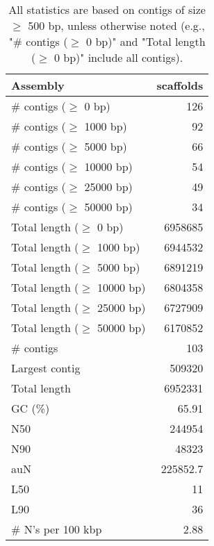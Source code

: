 \documentclass[12pt,a4paper]{article}
\begin{document}
\begin{table}[ht]
\begin{center}
\caption{All statistics are based on contigs of size $\geq$ 500 bp, unless otherwise noted (e.g., "\# contigs ($\geq$ 0 bp)" and "Total length ($\geq$ 0 bp)" include all contigs).}
\begin{tabular}{|l*{1}{|r}|}
\hline
Assembly & scaffolds \\ \hline
\# contigs ($\geq$ 0 bp) & 126 \\ \hline
\# contigs ($\geq$ 1000 bp) & 92 \\ \hline
\# contigs ($\geq$ 5000 bp) & 66 \\ \hline
\# contigs ($\geq$ 10000 bp) & 54 \\ \hline
\# contigs ($\geq$ 25000 bp) & 49 \\ \hline
\# contigs ($\geq$ 50000 bp) & 34 \\ \hline
Total length ($\geq$ 0 bp) & 6958685 \\ \hline
Total length ($\geq$ 1000 bp) & 6944532 \\ \hline
Total length ($\geq$ 5000 bp) & 6891219 \\ \hline
Total length ($\geq$ 10000 bp) & 6804358 \\ \hline
Total length ($\geq$ 25000 bp) & 6727909 \\ \hline
Total length ($\geq$ 50000 bp) & 6170852 \\ \hline
\# contigs & 103 \\ \hline
Largest contig & 509320 \\ \hline
Total length & 6952331 \\ \hline
GC (\%) & 65.91 \\ \hline
N50 & 244954 \\ \hline
N90 & 48323 \\ \hline
auN & 225852.7 \\ \hline
L50 & 11 \\ \hline
L90 & 36 \\ \hline
\# N's per 100 kbp & 2.88 \\ \hline
\end{tabular}
\end{center}
\end{table}
\end{document}
